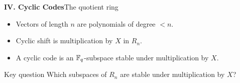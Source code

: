 \begin{frame}{\textbf{IV. Cyclic Codes}}{The quotient ring}
\small
{}
\begin{itemize}
  \item Vectors of length $n$ are polynomials of degree $<n$.
  \item Cyclic shift is multiplication by $X$ in $R_n$.
  \item A cyclic code is an $\mathbb{F}_q$-subspace stable under multiplication by $X$.
\end{itemize}
\begin{block}{Key question}
Which subspaces of $R_n$ are stable under multiplication by $X$?
\end{block}
\end{frame}

